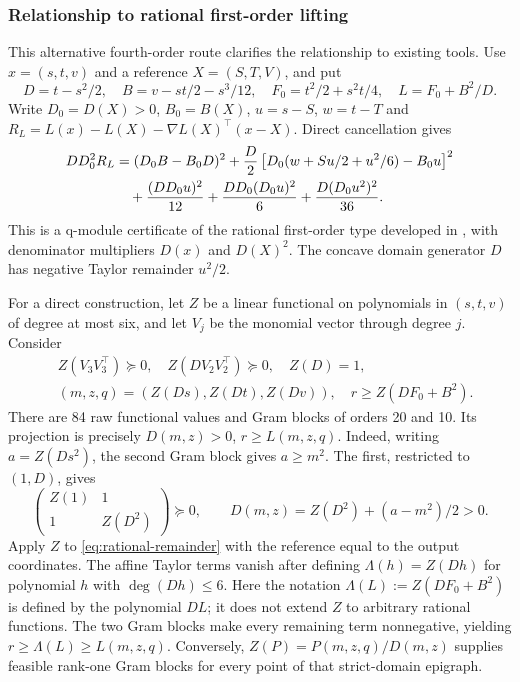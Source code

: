 \documentclass[pdflatex,sn-mathphys-num]{sn-jnl}
\theoremstyle{thmstyleone}
\theoremstyle{thmstyletwo}\newtheorem{remark}[theorem]{Remark}
\begin{document}
\subsubsection{Relationship to rational first-order lifting}\label{app:rational}
This alternative fourth-order route clarifies the relationship to existing tools.
Use $x=(s,t,v)$ and a reference $X=(S,T,V)$, and put
\[
 D=t-s^2/2,\quad B=v-st/2-s^3/12,\quad
 F_0=t^2/2+s^2t/4,\quad L=F_0+B^2/D.
\]
Write $D_0=D(X)>0$, $B_0=B(X)$, $u=s-S$, $w=t-T$ and
$R_L=L(x)-L(X)-\nabla L(X)^\top(x-X)$. Direct cancellation gives
\begin{align}
 DD_0^2R_L
 &= (D_0B-B_0D)^2
 +\frac D2\left[D_0(w+Su/2+u^2/6)-B_0u\right]^2\notag\\
 &\quad+\frac{(DD_0u)^2}{12}
 +\frac{DD_0(D_0u)^2}{6}
 +\frac{D(D_0u^2)^2}{36}.\label{eq:rational-remainder}
\end{align}
This is a q-module certificate of the rational first-order type developed
in \cite{nierational}, with denominator multipliers $D(x)$ and $D(X)^2$.
The concave domain generator $D$ has negative Taylor remainder $u^2/2$.

For a direct construction, let $Z$ be a linear functional on polynomials
in $(s,t,v)$ of degree at most six, and let $V_j$ be the monomial vector
through degree $j$. Consider
\begin{align*}
 &Z(V_3V_3^\top)\succeq0,\quad Z(DV_2V_2^\top)\succeq0,\quad Z(D)=1,\\
 &(m,z,q)=(Z(Ds),Z(Dt),Z(Dv)),\quad r\ge Z(DF_0+B^2).
\end{align*}
There are 84 raw functional values and Gram blocks of orders 20 and 10.
Its projection is precisely $D(m,z)>0$, $r\ge L(m,z,q)$.
Indeed, writing $a=Z(Ds^2)$, the second Gram block gives $a\ge m^2$.
The first, restricted to $(1,D)$, gives
\[
 \begin{pmatrix}Z(1)&1\\1&Z(D^2)\end{pmatrix}\succeq0,
 \qquad D(m,z)=Z(D^2)+(a-m^2)/2>0.
\]
Apply $Z$ to \eqref{eq:rational-remainder} with the reference equal to
the output coordinates. The affine Taylor terms vanish after defining $\Lambda(h)=Z(Dh)$ for
polynomial $h$ with $\deg(Dh)\le6$. Here the notation
$\Lambda(L):=Z(DF_0+B^2)$ is defined by the polynomial $DL$;
it does not extend $Z$ to arbitrary rational functions. The two Gram
blocks make every remaining term nonnegative, yielding
$r\ge\Lambda(L)\ge L(m,z,q)$.
Conversely, $Z(P)=P(m,z,q)/D(m,z)$ supplies feasible rank-one Gram blocks
for every point of that strict-domain epigraph.
\end{document}
